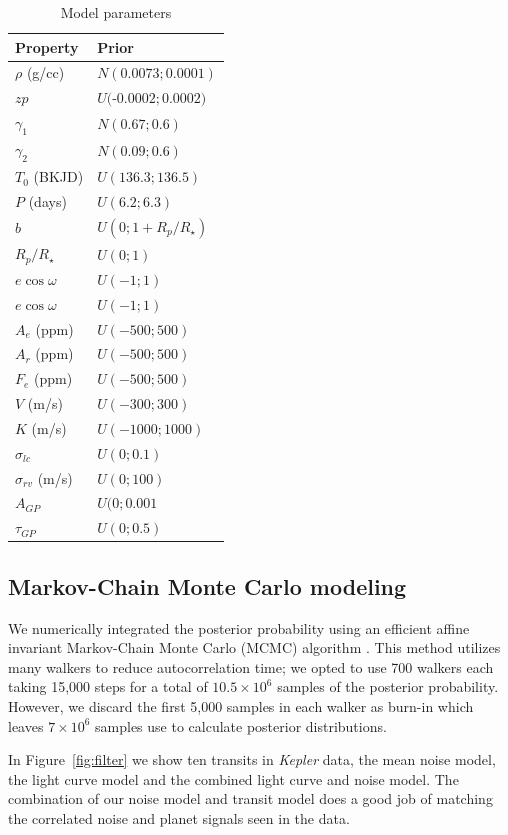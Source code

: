 \documentclass[apjl]{emulateapj}
\begin{document}
\begin{table}
\centering
\caption{Model parameters}\label{tab:priors}
\begin{tabular}{l l }
Property & Prior \\
\hline
$\rho$ (g/cc)		&	$N(0.0073;0.0001)$ \\
$zp$				& 	$U($-$0.0002;0.0002)$\\
$\gamma_1$		&	$N(0.67;0.6)$ \\
$\gamma_2$		&	$N(0.09;0.6)$\\
$T_0$ (BKJD)& $U(136.3;136.5)$\\
$P$ (days) & $U(6.2;6.3)$\\
$b$ & $U(0;1+R_{p}/R_{\star})$\\
$R_{p}/R_{\star}$ & $U(0;1)$ \\
$e\cos{\omega}$ &$U(-1;1)$ \\
$e\cos{\omega}$ & $U(-1;1)$\\
$A_e$ (ppm)&$U(-500;500)$ \\
$A_r$ (ppm)& $U(-500;500)$\\
$F_e$ (ppm)& $U(-500;500)$\\
$V$ (m/s)&$U(-300;300)$ \\
$K$ (m/s)&$U(-1000;1000)$ \\
$\sigma_{lc}$ & $U(0;0.1)$\\
$\sigma_{rv}$ (m/s)&$U(0;100)$ \\
$A_{GP}$ &  $U(0;0.001$ \\
$\tau_{GP}$ &  $U(0;0.5)$ \\
\hline
\end{tabular}
\end{table}

\subsection{Markov-Chain Monte Carlo modeling}
We numerically integrated the posterior probability using an efficient affine invariant Markov-Chain Monte Carlo (MCMC) algorithm \citep{goodman10,foreman13}.  This method utilizes many walkers to reduce autocorrelation time; we opted to use 700 walkers each taking 15,000 steps for a total of $10.5\times10^6$ samples of the posterior probability. However, we discard the first 5,000 samples in each walker as burn-in which leaves $7\times10^6$ samples use to calculate posterior distributions.

In Figure~\ref{fig:filter} we show ten transits in \emph{Kepler} data, the mean noise model, the light curve model and the combined light curve and noise model. The combination of our noise model and transit model does a good job of matching the correlated noise and planet signals seen in the data.
\end{document}
